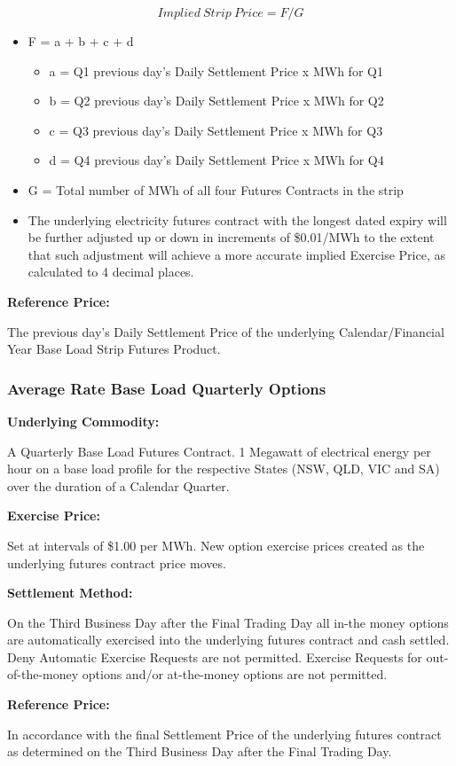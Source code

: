\documentclass[12pt]{article}
\begin{document}
\begin{flushleft}
\begin{itemize}
\end{itemize}
$$ Implied\ Strip\ Price = F/G $$
\begin{itemize}
    \item F = a + b + c + d
    \begin{itemize}
        \item a = Q1 previous day’s Daily Settlement Price x MWh for Q1
        \item b = Q2 previous day’s Daily Settlement Price x MWh for Q2
        \item c = Q3 previous day’s Daily Settlement Price x MWh for Q3
        \item d = Q4 previous day’s Daily Settlement Price x MWh for Q4
    \end{itemize}
    \item G = Total number of MWh of all four Futures Contracts in the strip
    \item The underlying electricity futures contract with the longest dated expiry will be further adjusted up or down in increments of \$0.01/MWh to the extent that such adjustment will achieve a more accurate implied Exercise Price, as calculated to 4 decimal places.
\end{itemize}
\textbf{Reference Price:} \par
The previous day’s Daily Settlement Price of the underlying Calendar/Financial Year Base Load Strip Futures Product.
\end{flushleft}

\subsubsection{Average Rate Base Load Quarterly Options}
\begin{flushleft}
\textbf{Underlying Commodity:} \par
A Quarterly Base Load Futures Contract. 1 Megawatt of electrical energy per hour on a base load profile for the respective States (NSW, QLD, VIC and SA) over the duration of a Calendar Quarter.\par
\textbf{Exercise Price:} \par
Set at intervals of \$1.00 per MWh. New option exercise prices created as the underlying futures contract price moves.\par
\textbf{Settlement Method:} \par
On the Third Business Day after the Final Trading Day all in-the money options are automatically exercised into the underlying futures contract and cash settled. Deny Automatic Exercise Requests are not permitted. Exercise Requests for out-of-the-money options and/or at-the-money options are not permitted. \par
\textbf{Reference Price:} \par
In accordance with the final Settlement Price of the underlying futures contract as determined on the Third Business Day after the Final Trading Day.
\end{flushleft}
\newpage
\end{document}
